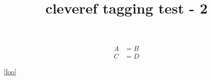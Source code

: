 \documentclass{book}
\title{cleveref tagging test - 2}
\begin{document}
\begin{align}
A &= B \label{foo} \\
C &= D
\end{align}

\cref{foo}
\end{document}
